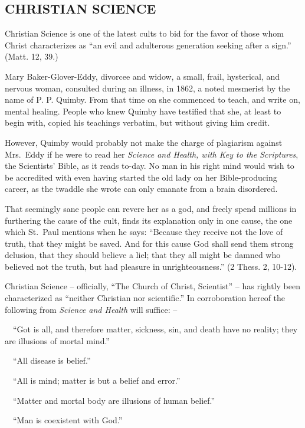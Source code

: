 \documentclass[
]{book}
\begin{document}
\hypertarget{christian-science}{%
\subsection{CHRISTIAN SCIENCE}\label{christian-science}}

Christian Science is one of the latest cults to bid for the favor of those whom Christ characterizes as ``an evil and adulterous generation seeking after a sign.'' (Matt. 12, 39.)

Mary Baker-Glover-Eddy, divorcee and widow, a small, frail, hysterical, and nervous woman, consulted during an illness, in 1862, a noted mesmerist by the name of P. P. Quimby. From that time on she commenced to teach, and write on, mental healing. People who knew Quimby have testified that she, at least to begin with, copied his teachings verbatim, but without giving him credit.

However, Quimby would probably not make the charge of plagiarism against Mrs.~Eddy if he were to read her \emph{Science and Health, with Key to the Scriptures}, the Scientists' Bible, as it reads to-day. No man in his right mind would wish to be accredited with even having started the old lady on her Bible-producing career, as the twaddle she wrote can only emanate from a brain disordered.

That seemingly sane people can revere her as a god, and freely spend millions in furthering the cause of the cult, finds its explanation only in one cause, the one which St.~Paul mentions when he says: ``Because they receive not the love of truth, that they might be saved. And for this cause God shall send them strong delusion, that they should believe a liel; that they all might be damned who believed not the truth, but had pleasure in unrighteousness.'' (2 Thess. 2, 10-12).

Christian Science -- officially, ``The Church of Christ, Scientist'' -- has rightly been characterized as ``neither Christian nor scientific.'' In corroboration hereof the following from \emph{Science and Health} will suffice: --

~~``Got is all, and therefore matter, sickness, sin, and death have no reality; they are illusions of mortal mind.''

~~``All disease is belief.''

~~``All is mind; matter is but a belief and error.''

~~``Matter and mortal body are illusions of human belief.''

~~``Man is coexistent with God.''
\end{document}
